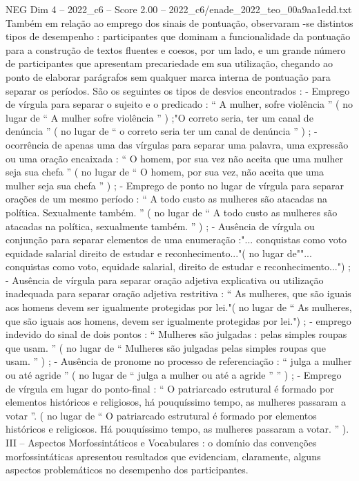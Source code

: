 \begin{textsample}{NEG Dim 4 – 2022\_c6 – Score 2.00 – 2022\_c6/enade\_2022\_teo\_00a9aa1edd.txt}
Também em relação ao emprego dos sinais de pontuação, observaram -se distintos tipos de desempenho : participantes que dominam a funcionalidade da pontuação para a construção de textos fluentes e coesos, por um lado, e um grande número de participantes que apresentam precariedade em sua utilização, chegando ao ponto de elaborar parágrafos sem qualquer marca interna de pontuação para separar os períodos.
São os seguintes os tipos de desvios encontrados : - Emprego de vírgula para separar o sujeito e o predicado : “ A mulher, sofre violência ” ( no lugar de “ A mulher sofre violência ” ) ;"O correto seria, ter um canal de denúncia ” ( no lugar de “ o correto seria ter um canal de denúncia ” ) ; - ocorrência de apenas uma das vírgulas para separar uma palavra, uma expressão ou uma oração encaixada : “ O homem, por sua vez não aceita que uma mulher seja sua chefa ” ( no lugar de “ O homem, por sua vez, não aceita que uma mulher seja sua chefa ” ) ; - Emprego de ponto no lugar de vírgula para separar orações de um mesmo período : “ A todo custo as mulheres são atacadas na política.
Sexualmente também. ” ( no lugar de “ A todo custo as mulheres são atacadas na política, sexualmente também. ” ) ; - Ausência de vírgula ou conjunção para separar elementos de uma enumeração :"... conquistas como voto equidade salarial direito de estudar e reconhecimento..."( no lugar de""... conquistas como voto, equidade salarial, direito de estudar e reconhecimento...") ; - Ausência de vírgula para separar oração adjetiva explicativa ou utilização inadequada para separar oração adjetiva restritiva : “ As mulheres, que são iguais aos homens devem ser igualmente protegidas por lei."( no lugar de “ As mulheres, que são iguais aos homens, devem ser igualmente protegidas por lei.") ; - emprego indevido do sinal de dois pontos : “ Mulheres são julgadas : pelas simples roupas que usam. ” ( no lugar de “ Mulheres são julgadas pelas simples roupas que usam. ” ) ; - Ausência de pronome no processo de referenciação : “ julga a mulher ou até agride ” ( no lugar de “ julga a mulher ou até a agride ” ” ) ; - Emprego de vírgula em lugar do ponto-final : “ O patriarcado estrutural é formado por elementos históricos e religiosos, há pouquíssimo tempo, as mulheres passaram a votar ”. ( no lugar de “ O patriarcado estrutural é formado por elementos históricos e religiosos.
Há pouquíssimo tempo, as mulheres passaram a votar. ” ).
III – Aspectos Morfossintáticos e Vocabulares : o domínio das convenções morfossintáticas apresentou resultados que evidenciam, claramente, alguns aspectos problemáticos no desempenho dos participantes.

\end{textsample}
